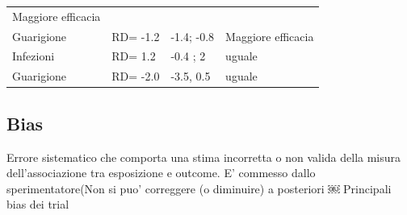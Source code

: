 \documentclass[]{book}
\begin{document}
\begin{longtable}[]{@{}llll@{}}
\begin{minipage}[t]{0.22\columnwidth}
Maggiore efficacia\strut
\end{minipage}\tabularnewline
\begin{minipage}[t]{0.22\columnwidth}\raggedright
Guarigione\strut
\end{minipage} & \begin{minipage}[t]{0.22\columnwidth}\raggedright
RD= -1.2\strut
\end{minipage} & \begin{minipage}[t]{0.22\columnwidth}\raggedright
-1.4; -0.8\strut
\end{minipage} & \begin{minipage}[t]{0.22\columnwidth}\raggedright
Maggiore efficacia\strut
\end{minipage}\tabularnewline
\begin{minipage}[t]{0.22\columnwidth}\raggedright
Infezioni\strut
\end{minipage} & \begin{minipage}[t]{0.22\columnwidth}\raggedright
RD= 1.2\strut
\end{minipage} & \begin{minipage}[t]{0.22\columnwidth}\raggedright
-0.4 ; 2\strut
\end{minipage} & \begin{minipage}[t]{0.22\columnwidth}\raggedright
uguale\strut
\end{minipage}\tabularnewline
\begin{minipage}[t]{0.22\columnwidth}\raggedright
Guarigione\strut
\end{minipage} & \begin{minipage}[t]{0.22\columnwidth}\raggedright
RD= -2.0\strut
\end{minipage} & \begin{minipage}[t]{0.22\columnwidth}\raggedright
-3.5, 0.5\strut
\end{minipage} & \begin{minipage}[t]{0.22\columnwidth}\raggedright
uguale\strut
\end{minipage}\tabularnewline
\bottomrule
\end{longtable}

\hypertarget{bias}{%
\subsection{Bias}\label{bias}}

Errore sistematico che comporta una stima incorretta o non valida della misura dell'associazione tra esposizione e outcome. E' commesso dallo sperimentatore(Non si puo' correggere (o diminuire) a posteriori
￼
Principali bias dei trial
\end{document}
